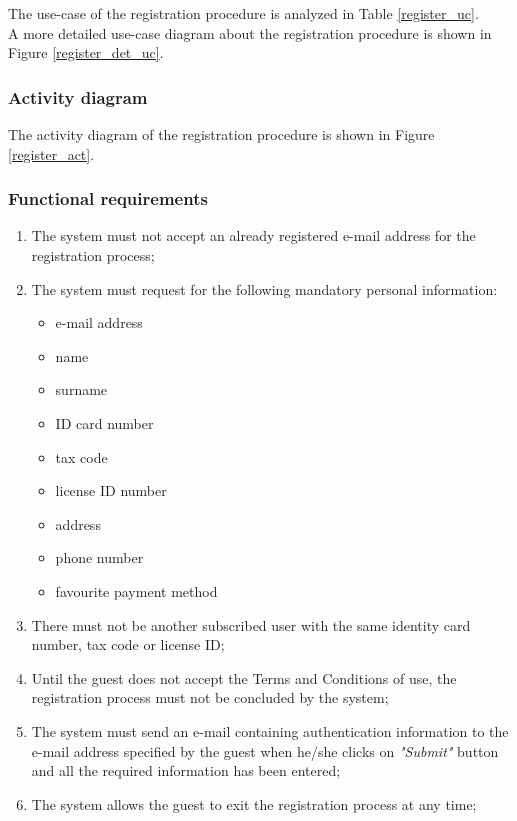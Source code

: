 The use-case of the registration procedure is analyzed in Table \ref{register_uc}. \\
A more detailed use-case diagram about the registration procedure is shown in Figure \ref{register_det_uc}.

\subsubsection{Activity diagram}

The activity diagram of the registration procedure is shown in Figure \ref{register_act}.

\subsubsection{Functional requirements}
\begin{enumerate}
\item The system must not accept an already registered e-mail address for the registration process;
\item The system must request for the following mandatory personal information:
	\begin{itemize}
	\item e-mail address
	\item name
	\item surname
	\item ID card number
	\item tax code
	\item license ID number
	\item address
	\item phone number
	\item favourite payment method
	\end{itemize}
\item There must not be another subscribed user with the same identity card number, tax code or license ID;
\item Until the guest does not accept the Terms and Conditions of use, the registration process must not be concluded by the system;
\item The system must send an e-mail containing authentication information to the e-mail address specified by the guest when he/she clicks on \emph{"Submit"} button and all the required information has been entered;
\item The system allows the guest to exit the registration process at any time;
\end{enumerate}

